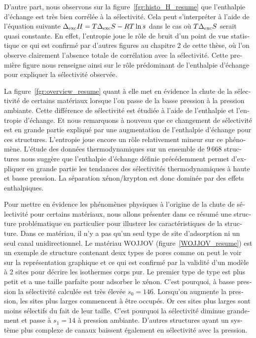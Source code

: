 \documentclass[thesis]{subfiles}
\begin{document}
\begin{otherlanguage}{french}
D'autre part, nous observons sur la figure~\ref{fgr:histo_H_resume} que l'enthalpie d'échange est très bien corrélée à la sélectivité. Cela peut s'interpréter à l'aide de l'équation suivante $\Delta_{\text{exc}}H= T\Delta_{\text{exc}}S - RT\ln{s}$ dans le cas où $T\Delta_{\text{exc}}S$ serait quasi constante. En effet, l'entropie joue le rôle de bruit d'un point de vue statistique ce qui est confirmé par d'autres figures au chapitre 2 de cette thèse, où l'on observe clairement l'absence totale de corrélation avec la sélectivité. Cette première figure nous renseigne ainsi sur le rôle prédominant de l'enthalpie d'échange pour expliquer la sélectivité observée. 

La figure~\ref{fgr:overview_resume} quant à elle met en évidence la chute de la sélectivité de certains matériaux lorsque l'on passe de la basse pression à la pression ambiante. Cette différence de sélectivité est étudiée à l'aide de l'enthalpie et l'entropie d'échange. Et nous remarquons à nouveau que ce changement de sélectivité est en grande partie expliqué par une augmentation de l'enthalpie d'échange pour ces structures. L'entropie joue encore un rôle relativement mineur sur ce phénomène. L'étude des données thermodynamiques sur un ensemble de 9\,668 structures nous suggère que l'enthalpie d'échange définie précédemment permet d'expliquer en grande partie les tendances des sélectivités thermodynamiques à haute et basse pression. La séparation xénon/krypton est donc dominée par des effets enthalpiques. 

Pour mettre en évidence les phénomènes physiques à l'origine de la chute de sélectivité pour certains matériaux, nous allons présenter dans ce résumé une structure problématique en particulier pour illustrer les caractéristiques de la structure. 
Dans ce matériau, il n'y a pas qu'un seul type de site d'adsorption ni un seul canal unidirectionnel. Le matériau WOJJOV (figure~\ref{WOJJOV_resume}) est un exemple de structure contenant deux types de pores comme on peut le voir sur la représentation graphique et ce qui est confirmé par la validité d'un modèle à 2 sites pour décrire les isothermes corps pur. Le premier type de type est plus petit et a une taille parfaite pour adsorber le xénon. C'est pourquoi, à basse pression la sélectivité calculée est très élevée $s_0=146$. Lorsqu'on augmente la pression, les sites plus larges commencent à être occupés. Or ces sites plus larges sont moins sélectifs du fait de leur taille. C'est pourquoi la sélectivité diminue grandement et passe à $s_1=14$ à pression ambiante. D'autres structures ayant un système plus complexe de canaux baissent également en sélectivité avec la pression.


\end{otherlanguage}
\end{document}
